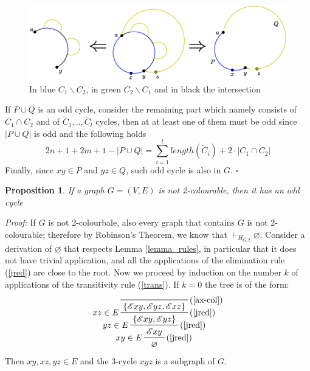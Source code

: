 \documentclass[a4paper,12pt,oneside]{book}
\newtheorem{proposition}[theorem]{Proposition}
\newcommand{\E}{\mathscr{E}}
\newcommand*{\QED}{\hfill\ensuremath{\square}}
\let\emptyset\varnothing
\begin{document}
\begin{figure}[h]
\centering
\includegraphics[scale=0.5]{oddcycles-interceptions.eps}
\caption{In blue $C_1 \backslash C_2 $, in green $C_2\backslash C_1 $ and in black the intersection }
\end{figure}
If $P\cup Q$ is an odd cycle, consider the remaining part which namely consists of $C_1\cap C_2$ and of $\tilde{C}_1,..,\tilde{C}_l$ cycles, then at at least one of them must be odd since $|P\cup Q|$ is odd and the following holds $$2n+1+2m+1-|P\cup Q| = \sum^l_{i=1} length(\tilde{C}_i) + 2\cdot |C_1\cap C_2|   $$
Finally, since $xy\in P$ and $yz\in Q$, such odd cycle is also in $G$. 
\QED



\begin{proposition} \label{mio}
If a graph $G=(V,E)$ is not 2-colourable, then it has an odd cycle
\end{proposition}
\textit{Proof:}
If $G$ is not 2-colourbale, also every graph that contains $G$ is not 2-colourable; therefore by Robinson's Theorem, we know that  $\vdash_{H_{G,2}} \emptyset$. Consider a derivation of $\emptyset$  that respects Lemma \ref{lemma_rules}, in particular that it does not have trivial application, and all the applications of the elimination rule (\ref{jred}) are close to the root.
Now we proceed by induction on the number $k$ of applications of the transitivity rule (\ref{trans}).
If $k=0$ the tree is of the form:
\begin{eqnarray*}
\prftree[r,l]{(\ref{jred})}{$xy \in E$}{
\prftree[r,l]{(\ref{jred})}{$yz \in E$}{
\prftree[r,l]{(\ref{jred})}{$xz \in E$}{
\prftree[r]{(\ref{ax-col})} { }{ \{ \E xy , \E yz, \E xz  \} } } 
{\{ \E xy , \E yz \} } } 
{ \E xy  } }
{ \emptyset }
\end{eqnarray*}
Then $xy,xz,yz \in E$ and the 3-cycle $xyz$ is a subgraph of $G$.
 
\end{document}
